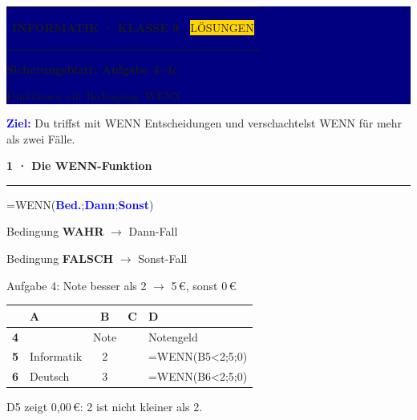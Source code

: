 \documentclass[10pt,a4paper]{article}
\newcommand{\sectiontitle}[1]{%
  \vspace{2.3mm}
  {\color{Blue}\bfseries\large #1}\par
  \vspace{0.8mm}
  {\color{Blue}\rule{\linewidth}{0.7pt}}\par
  \vspace{1.2mm}
}
\newcommand{\gridhead}[1]{\cellcolor{GridHead}\textcolor{Muted}{\bfseries\small #1}}
\newcommand{\gridrow}[1]{\cellcolor{GridHead}\textcolor{Muted}{\bfseries\small #1}}
\newcommand{\sheetsetup}{%
  \arrayrulecolor{GridLine}\setlength{\arrayrulewidth}{0.4pt}%
  \renewcommand{\arraystretch}{1.25}}
\begin{document}
\colorbox{Navy}{%
  \parbox{\dimexpr\linewidth-2\fboxsep\relax}{%
    \vspace{3mm}\color{white}
    \begin{tabularx}{\linewidth}{@{}Xr@{}}
      {\small\bfseries INFORMATIK · KLASSE 9} &
      \colorbox{Gold}{\color{Navy}\small\bfseries\strut LÖSUNGEN}
    \end{tabularx}
    \vspace{2.5mm}

    {\fontsize{22}{25}\selectfont\bfseries Sicherungsblatt: Aufgabe 4–4c}\par
    \vspace{1mm}
    {\large Funktionen mit Bedingung: WENN}
    \vspace{3mm}
  }%
}

\vspace{3mm}
\colorbox{Sky}{%
  \parbox{\dimexpr\linewidth-2\fboxsep\relax}{%
    \vspace{1.8mm}
    \textcolor{Blue}{\bfseries Ziel:}
    Du triffst mit WENN Entscheidungen und verschachtelst WENN für mehr als
    zwei Fälle.
    \vspace{1.8mm}
  }%
}

\sectiontitle{1 · Die WENN-Funktion}

\begin{minipage}[t]{\dimexpr\linewidth-86mm\relax}
  \vspace{0pt}
  \colorbox{CodeBg}{\parbox{\dimexpr\linewidth-2\fboxsep\relax}{\centering
    \vspace{1mm}
    \ttfamily =WENN(\textcolor{Blue}{\bfseries Bed.};\textcolor{Blue}{\bfseries Dann};\textcolor{Blue}{\bfseries Sonst})
    \vspace{1mm}}}\par
  \vspace{1.5mm}
  Bedingung \textbf{WAHR} $\rightarrow$ Dann-Fall\par
  \vspace{1mm}
  Bedingung \textbf{FALSCH} $\rightarrow$ Sonst-Fall\par
  \vspace{1.5mm}
  {\small Aufgabe 4: Note besser als 2 $\rightarrow$ 5\,€, sonst 0\,€}
\end{minipage}\hfill
\begin{minipage}[t]{80mm}
  \vspace{0pt}
  \sheetsetup
  \begin{tabular}{|c|l|c|c|l|}
    \hline
    \cellcolor{GridHead} & \gridhead{A} & \gridhead{B} & \gridhead{C} & \gridhead{D} \\ \hline
    \gridrow{4} & & \small Note & & \small Notengeld \\ \hline
    \gridrow{5} & \small Informatik & \small 2 & & \cellcolor{Cell}\ttfamily\small =WENN(B5<2;5;0) \\ \hline
    \gridrow{6} & \small Deutsch & \small 3 & & \ttfamily\small =WENN(B6<2;5;0) \\ \hline
  \end{tabular}\par
  \vspace{1mm}
  {\small D5 zeigt 0,00\,€: 2 ist nicht kleiner als 2.}
\end{minipage}
\end{document}
